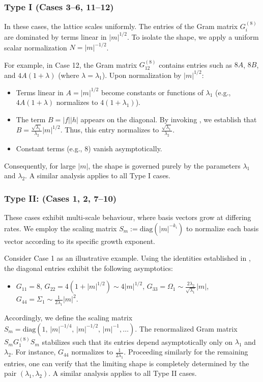\documentclass{amsart}
\theoremstyle{plain}
\theoremstyle{definition}
\theoremstyle{remark}
\numberwithin{equation}{section}
\begin{document}
\subsubsection{Type I (Cases 3--6, 11--12)}
In these cases, the lattice scales uniformly. The entries of the Gram matrix $G_i^{(8)}$ are dominated by terms linear in $|m|^{1/2}$. To isolate the shape, we apply a uniform scalar normalization $N = |m|^{-1/2}$.

For example, in Case 12, the Gram matrix $G_{12}^{(8)}$ contains entries such as $8A$, $8B$, and $4A(1+\lambda)$ (where $\lambda = \lambda_1$). Upon normalization by $|m|^{1/2}$:
\begin{itemize}
    \item Terms linear in $A = |m|^{1/2}$ become constants or functions of $\lambda_1$ (e.g., $4A(1+\lambda)$ normalizes to $4(1+\lambda_1)$).
    \item The term $B = |f||h|$ appears on the diagonal. By invoking , we establish that $B = \frac{\sqrt{\lambda_1}}{\lambda_2}|m|^{1/2}$. Thus, this entry normalizes to $\frac{\sqrt{\lambda_1}}{\lambda_2}$.
    \item Constant terms (e.g., 8) vanish asymptotically.
\end{itemize}
Consequently, for large $|m|$, the shape is governed purely by the parameters $\lambda_1$ and $\lambda_2$. A similar analysis applies to all Type I cases.
\subsubsection{Type II: (Cases 1, 2, 7--10)}
These cases exhibit multi-scale behaviour, where basis vectors grow at differing rates. We employ the scaling matrix $S_m:= \text{diag}(|m|^{-k_i})$ to normalize each basis vector according to its specific growth exponent.

\par Consider Case 1 as an illustrative example. Using the identities established in , the diagonal entries exhibit the following asymptotics:
\begin{itemize}
    \item $G_{11} = 8$, \qquad $G_{22} = 4(1+|m|^{1/2}) \sim 4|m|^{1/2}$,
    \qquad $G_{33} = \Omega_1 \sim  \frac{2\lambda_2}{\sqrt{\lambda_1}}|m|$, \qquad $G_{44} = \Sigma_1 \sim  \frac{1}{2\lambda_1}|m|^2$.
\end{itemize}
Accordingly, we define the scaling matrix $S_m = \text{diag}\left(1, \, |m|^{-1/4}, \, |m|^{-1/2}, \, |m|^{-1}, \dots \right)$. The renormalized Gram matrix $S_m G_{1}^{(8)} S_m$ stabilizes such that its entries depend asymptotically only on $\lambda_1$ and $\lambda_2$. For instance, $G_{44}$ normalizes to  $\frac{1}{2\lambda_1}$. Proceeding similarly for the remaining entries, one can verify that the limiting shape is completely determined by the pair $(\lambda_1, \lambda_2)$. A similar analysis applies to all Type II cases.
\end{document}
